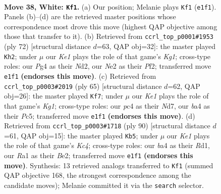 \documentclass[11pt]{article}
\begin{document}
\clearpage

\begin{figure}[p]\centering
\begin{subfigure}{0.46\textwidth}\centering
\resizebox{\linewidth}{!}{%
\newchessgame
\chessboard[
  setfen={r5k1/4n3/8/pp2N3/b1p3P1/P1P1b3/1B2N3/R3K3 w - - 0 38},
  showmover=false,
  pgfstyle=straightmove, color=movearrow, markmove={e1-f1}
]}
\caption{}
\end{subfigure}\hfill
\begin{subfigure}{0.46\textwidth}\centering
\resizebox{\linewidth}{!}{%
\newchessgame
\chessboard[
  setfen={r4bk1/8/4pn1p/4p1p1/4P3/3RB2P/3N1PP1/6K1 w - - 0 37},
  showmover=false,
  pgfstyle=straightmove, color=movearrow, markmove={g1-h2}
]}
\caption{}
\end{subfigure}
\\[4pt]
\begin{subfigure}{0.46\textwidth}\centering
\resizebox{\linewidth}{!}{%
\newchessgame
\chessboard[
  setfen={r5k1/3n2p1/2b2p1p/P1p5/8/2B2PNP/6P1/3R2K1 b - - 0 33},
  showmover=false,
  pgfstyle=straightmove, color=movearrow, markmove={g8-f7}
]}
\caption{}
\end{subfigure}\hfill
\begin{subfigure}{0.46\textwidth}\centering
\resizebox{\linewidth}{!}{%
\newchessgame
\chessboard[
  setfen={2r3k1/5pp1/2n1pb1p/2P5/2K3P1/1N5P/1P2B3/3R4 w - - 3 46},
  showmover=false,
  pgfstyle=straightmove, color=movearrow, markmove={c4-b5}
]}
\caption{}
\end{subfigure}
\caption{\textbf{Move 38, White: \texttt{Kf1}.} (a) Our position; Melanie plays \texttt{Kf1} (\texttt{e1f1}). Panels (b)--(d) are the retrieved master positions whose correspondence most drove this move (highest QAP objective among those that transfer to it). (b) Retrieved from \texttt{ccrl\_top\_p0001\#1953} (ply 72) [structural distance $d$=63, QAP obj=32]: the master played \texttt{Kh2}; under $\mu$ our \emph{Ke1} plays the role of that game's \emph{Kg1}; cross-type roles: our \emph{P}g4 as their \emph{N}d2, our \emph{N}e2 as their \emph{P}f2; transferred move \texttt{e1f1} \textbf{(endorses this move)}. (c) Retrieved from \texttt{ccrl\_top\_p0003\#2019} (ply 65) [structural distance $d$=62, QAP obj=26]: the master played \texttt{Kf7}; under $\mu$ our \emph{Ke1} plays the role of that game's \emph{Kg1}; cross-type roles: our \emph{p}c4 as their \emph{N}d7, our \emph{b}a4 as their \emph{P}c5; transferred move \texttt{e1f1} \textbf{(endorses this move)}. (d) Retrieved from \texttt{ccrl\_top\_p0003\#1718} (ply 90) [structural distance $d$=61, QAP obj=15]: the master played \texttt{Kb5}; under $\mu$ our \emph{Ke1} plays the role of that game's \emph{Kc4}; cross-type roles: our \emph{b}a4 as their \emph{R}d1, our \emph{R}a1 as their \emph{B}e2; transferred move \texttt{e1f1} \textbf{(endorses this move)}. Synthesis: 13 retrieved analogs transferred to \texttt{Kf1} (summed QAP objective 168, the strongest correspondence among the candidate moves); Melanie committed it via the \texttt{search} selector.}
\label{fig:thought-m74}
\end{figure}
\end{document}
